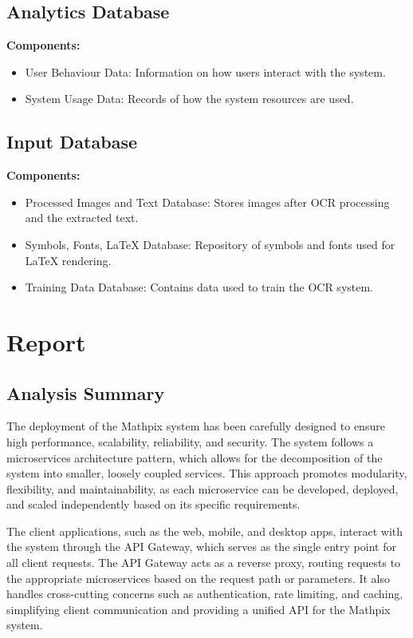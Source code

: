 \documentclass{article}
\begin{document}
\subsection{Analytics Database}
\textbf{Components:}
\begin{itemize}
    \item User Behaviour Data: Information on how users interact with the system.
    \item System Usage Data: Records of how the system resources are used.
\end{itemize}

\subsection{Input Database}
\textbf{Components:}
\begin{itemize}
    \item Processed Images and Text Database: Stores images after OCR processing and the extracted text.
    \item Symbols, Fonts, LaTeX Database: Repository of symbols and fonts used for LaTeX rendering.
    \item Training Data Database: Contains data used to train the OCR system.
\end{itemize}

\section{Report}
\subsection{Analysis Summary}
The deployment of the Mathpix system has been carefully designed to ensure high performance, scalability, reliability, and security. The system follows a microservices architecture pattern, which allows for the decomposition of the system into smaller, loosely coupled services. This approach promotes modularity, flexibility, and maintainability, as each microservice can be developed, deployed, and scaled independently based on its specific requirements.

The client applications, such as the web, mobile, and desktop apps, interact with the system through the API Gateway, which serves as the single entry point for all client requests. The API Gateway acts as a reverse proxy, routing requests to the appropriate microservices based on the request path or parameters. It also handles cross-cutting concerns such as authentication, rate limiting, and caching, simplifying client communication and providing a unified API for the Mathpix system.
\end{document}
